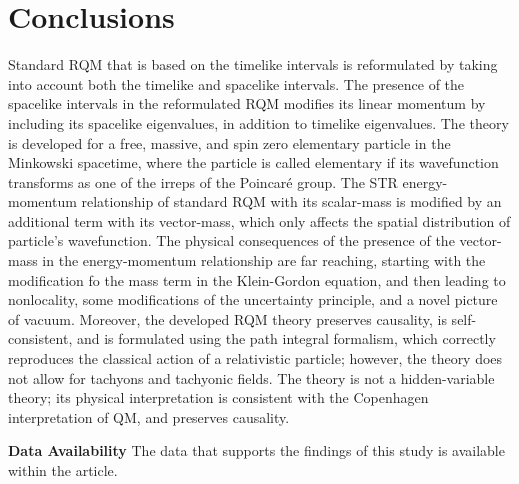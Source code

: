 \documentclass[12pt]{iopart}
\begin{document}
\section{Conclusions}

Standard RQM that is based on the timelike intervals is reformulated by taking 
into account both the timelike and spacelike intervals.  The presence of the 
spacelike intervals in the reformulated RQM modifies its linear momentum
by including its spacelike eigenvalues, in addition to timelike eigenvalues. 
The theory is developed for a free, massive, and spin zero elementary 
particle in the Minkowski spacetime, where the particle is called elementary
if its wavefunction transforms as one of the irreps of the Poincar\'e group. 
The STR energy-momentum relationship of standard RQM with its scalar-mass 
is modified by an additional term with its vector-mass, which only affects the 
spatial distribution of particle's wavefunction.  The physical consequences of 
the presence of the vector-mass in the energy-momentum relationship are far 
reaching, starting with the modification fo the mass term in the Klein-Gordon 
equation, and then leading to nonlocality, some modifications of the uncertainty 
principle, and a novel picture of vacuum.  Moreover, the developed RQM theory 
preserves causality, is self-consistent, and is formulated using the path integral 
formalism, which correctly reproduces the classical action of a relativistic particle; 
however, the theory does not allow for tachyons and tachyonic fields.  The theory 
is not a hidden-variable theory; its physical interpretation is consistent with the 
Copenhagen interpretation of QM, and preserves causality.
%

\bigskip\noindent
{\bf Data Availability}
The data that supports the findings of this study is available within the article.
\end{document}
